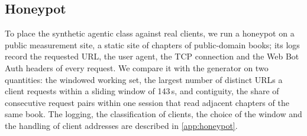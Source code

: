 \subsection{Honeypot}\label{sec:m-honeypot}
To place the synthetic agentic class against real clients, we run a honeypot on a public
measurement site, a static site of chapters of public-domain books; its logs record the
requested URL, the user agent, the TCP connection and the Web Bot Auth headers of every
request.
We compare it with the generator on two quantities: the windowed working set, the largest
number of distinct URLs a client requests within a sliding window of 143\,s, and
contiguity, the share of consecutive request pairs within one session that read adjacent
chapters of the same book.
The logging, the classification of clients, the choice of the window and the handling of
client addresses are described in \cref{app:honeypot}.

